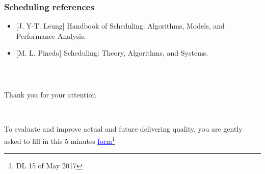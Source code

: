 \begin{frame} \frametitle{Scheduling references}

\begin{itemize}
\item{}[J. Y-T. Leung] Handbook of Scheduling: Algorithms, Models, and Performance Analysis. 
\item{}[M. L. Pinedo] Scheduling: Theory, Algorithms, and Systems. 
\end{itemize}

\end{frame}


\begin{comment}

\begin{frame}[t, allowframebreaks] \frametitle{References}


\end{frame}


\end{comment}




\begin{frame} \frametitle{~}
\Huge{\centerline{Thank you for your attention}}

\medskip~\medskip



\footnotesize To evaluate and improve actual and future delivering quality, you are gently asked to fill in this 5 minutes \href{https://docs.google.com/forms/d/e/1FAIpQLSfwxSb55IaeGEbYmbwQi0rnjXxNqUQVUr_sxtMGVZk4cPvWMw/viewform?usp=sf_link}{\textcolor{blue}{\underline{form}}}\footnote{DL 15 of May 2017}


\end{frame}

